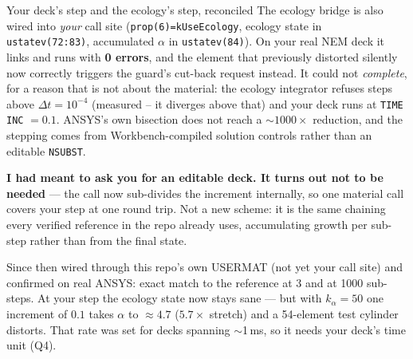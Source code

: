 \documentclass[aspectratio=169,11pt]{beamer}
\begin{document}
\begin{frame}{Your deck's step and the ecology's step, reconciled}
\small The ecology bridge is also wired into \emph{your} call site
(\texttt{prop(6)=kUseEcology}, ecology state in \texttt{ustatev(72:83)},
accumulated $\alpha$ in \texttt{ustatev(84)}). On your real NEM deck it links
and runs with \textbf{0 errors}, and the element that previously distorted
silently now correctly triggers the guard's cut-back request instead.
\vspace{3pt}
{\footnotesize It could not \emph{complete}, for a reason that is not about
the material: the ecology integrator refuses steps above
$\Delta t = 10^{-4}$ (measured -- it diverges above that) and your deck runs
at \texttt{TIME INC} $=0.1$. ANSYS's own bisection does not reach a
$\sim\!1000\times$ reduction, and the stepping comes from
Workbench-compiled solution controls rather than an editable \texttt{NSUBST}.}
\vspace{4pt}
\begin{center}
\colorbox{c3!12}{\parbox{0.9\linewidth}{\small
\textbf{I had meant to ask you for an editable deck. It turns out not to be
needed} --- the call now sub-divides the increment internally, so one
material call covers your step at one round trip. Not a new scheme: it is the
same chaining every verified reference in the repo already uses, accumulating
growth per sub-step rather than from the final state.}}
\end{center}
\vspace{2pt}
{\footnotesize Since then wired through this repo's own USERMAT (not yet your
call site) and confirmed on real ANSYS: exact match to the reference at 3 and
at 1000 sub-steps. At your step the ecology state now stays sane --- but with
$k_\alpha=50$ one increment of $0.1$ takes $\alpha$ to $\approx 4.7$
($5.7\times$ stretch) and a 54-element test cylinder distorts. That rate was
set for decks spanning $\sim$1\,ms, so it needs your deck's time unit (Q4).}
\end{frame}
\end{document}
